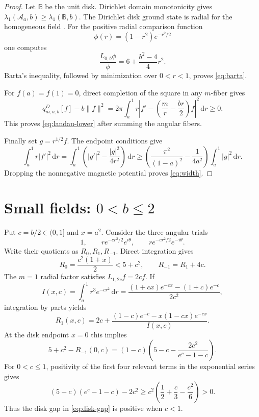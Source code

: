 \documentclass[11pt]{article}
\newcommand{\Aa}{\mathcal A_a}
\newcommand{\Bdisk}{\mathbb B}
\newcommand{\dd}{\,\mathrm d}
\begin{document}
\begin{proof}
Let $\Bdisk$ be the unit disk.  Dirichlet domain monotonicity gives
$\lambda_1(\Aa,b)\geq\lambda_1(\Bdisk,b)$.  The Dirichlet disk ground state
is radial for the homogeneous field \cite[Section 5]{Lotoreichik2025}.
For the positive radial comparison function
\[
       \phi(r)=(1-r^2)e^{-r^2/2}
\]
one computes
\[
       \frac{L_{0,b}\phi}{\phi}
       =6+\frac{b^2-4}{4}r^2.
\]
Barta's inequality, followed by minimization over $0<r<1$, proves
\eqref{eq:barta}.

For $f(a)=f(1)=0$, direct completion of the square in any $m$-fiber gives
\begin{equation}\label{eq:factorization}
 q^D_{m,a,b}[f]-b\|f\|^2
 =2\pi\int_a^1 r\left|f'-
       \left(\frac mr-\frac{br}{2}\right)f\right|^2\dd r\geq0.
\end{equation}
This proves \eqref{eq:landau-lower} after summing the angular fibers.

Finally set $g=r^{1/2}f$.  The endpoint conditions give
\[
 \int_a^1r|f'|^2\dd r
 =\int_a^1\left(|g'|^2-\frac{|g|^2}{4r^2}\right)\dd r
 \geq\left(\frac{\pi^2}{(1-a)^2}-\frac1{4a^2}\right)
       \int_a^1|g|^2\dd r.
\]
Dropping the nonnegative magnetic potential proves \eqref{eq:width}.
\end{proof}

\section[Small fields: 0 < b <= 2]{Small fields: $0<b\leq2$}\label{sec:small}

Put $c=b/2\in(0,1]$ and $x=a^2$.  Consider the three angular trials
\begin{equation}\label{eq:small-trials}
 1,\qquad r e^{-cr^2/2}e^{i\theta},\qquad
 r e^{-cr^2/2}e^{-i\theta}.
\end{equation}
Write their quotients as $R_0,R_1,R_{-1}$.  Direct integration gives
\begin{equation}\label{eq:R0-small}
 R_0=\frac{c^2(1+x)}2<5+c^2,
 \qquad R_{-1}=R_1+4c.
\end{equation}
The $m=1$ radial factor satisfies $L_{1,2c}f=2cf$.  If
\[
 I(x,c)=\int_a^1r^3e^{-cr^2}\dd r
 =\frac{(1+cx)e^{-cx}-(1+c)e^{-c}}{2c^2},
\]
integration by parts yields
\begin{equation}\label{eq:R1-exact}
 R_1(x,c)=2c+
 \frac{(1-c)e^{-c}-x(1-cx)e^{-cx}}{I(x,c)}.
\end{equation}
At the disk endpoint $x=0$ this implies
\begin{equation}\label{eq:disk-gap}
 5+c^2-R_{-1}(0,c)
 =(1-c)\left(5-c-\frac{2c^2}{e^c-1-c}\right).
\end{equation}
For $0<c\leq1$, positivity of the first four relevant terms in the
exponential series gives
\begin{equation}\label{eq:disk-gap-positive}
 (5-c)(e^c-1-c)-2c^2
 \geq c^2\left(\frac12+\frac c3-\frac{c^2}{6}\right)>0.
\end{equation}
Thus the disk gap in \eqref{eq:disk-gap} is positive when $c<1$.
\end{document}
